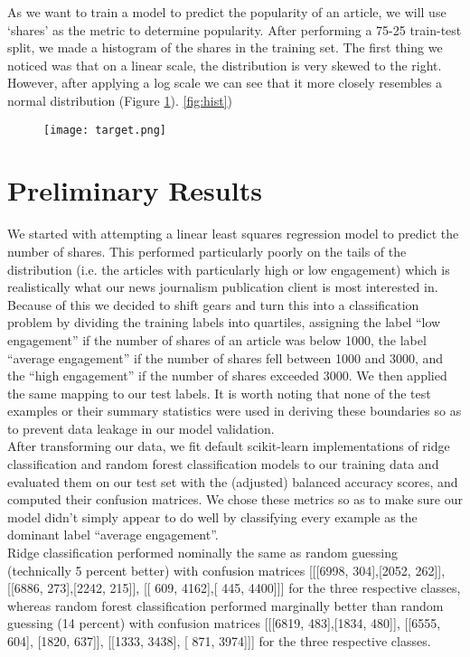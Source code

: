 \documentclass{article}
\begin{document}
As we want to train a model to predict the popularity of an article, we will use ‘shares’ as the metric to determine popularity. After performing a 75-25 train-test split, we made a histogram of the shares in the training set. The first thing we noticed was that on a linear scale, the distribution is very skewed to the right. However, after applying a log scale we can see that it more closely resembles a normal distribution (Figure \ref{fig:target}). 
\ref{fig:hist})
\begin{figure}[h!]
    \centering
    \texttt{[image: target.png]}
    \caption{}
    \label{fig:target}
\end{figure}

\section{Preliminary Results}

We started with attempting a linear least squares regression model to predict the number of shares. This performed particularly poorly on the tails of the distribution (i.e. the articles with particularly high or low engagement) which is realistically what our news journalism publication client is most interested in. Because of this we decided to shift gears and turn this into a classification problem by dividing the training labels into quartiles, assigning the label “low engagement” if the number of shares of an article was below 1000, the label “average engagement” if the number of shares fell between 1000 and 3000, and the “high engagement” if the number of shares exceeded 3000. We then applied the same mapping to our test labels. It is worth noting that none of the test examples or their summary statistics were used in deriving these boundaries so as to prevent data leakage in our model validation.\\

After transforming our data, we fit default scikit-learn implementations of ridge classification and random forest classification models to our training data and evaluated them on our test set with the (adjusted) balanced accuracy scores, and computed their confusion matrices. We chose these metrics so as to make sure our model didn’t simply appear to do well by classifying every example as the dominant label “average engagement”. \\

Ridge classification performed nominally the same as random guessing (technically 5 percent better) with confusion matrices [[[6998,  304],[2052,  262]], [[6886,  273],[2242,  215]], [[ 609, 4162],[ 445, 4400]]] for the three respective classes, whereas random forest classification performed marginally better than random guessing (14 percent) with confusion matrices [[[6819,  483],[1834,  480]], [[6555,  604], [1820,  637]], [[1333, 3438], [ 871, 3974]]] for the three respective classes.\\
\end{document}
